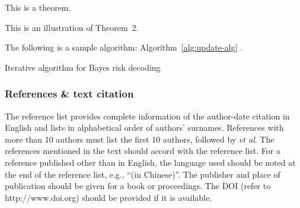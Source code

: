 \documentclass[twoside,twocolumn]{article}
\begin{document}
\begin{theorem}
This is a theorem.
\end{theorem}

\begin{theorem}
This is an illustration of Theorem~2.
\end{theorem}

The following is a sample algorithm: Algorithm~\ref{alg:update-alg} \citep{Xu11}.

\begin{algorithm}\small
\caption{Iterative algorithm for Bayes risk decoding} \centering
\begin{algorithmic}[1]
	\LOOP	
		\ENDFOR
		\ENDIF
	\ENDLOOP
\end{algorithmic}
	\label{alg:update-alg}
\end{algorithm}	

\subsubsection{References \& text citation}

The reference list provides complete information of the author-date citation in English and lists in alphabetical order of authors' surnames.
References with more than 10 authors must list the first 10 authors, followed by \emph{et al}. The references mentioned in the text should accord with the reference list. For a reference published other than in English, the language used should be noted at the end of the reference list, e.g., ``(in Chinese)''. The publisher and place of publication should be given for a book or proceedings. The DOI (refer to http://www.doi.org) should be provided if it is available.
\end{document}
